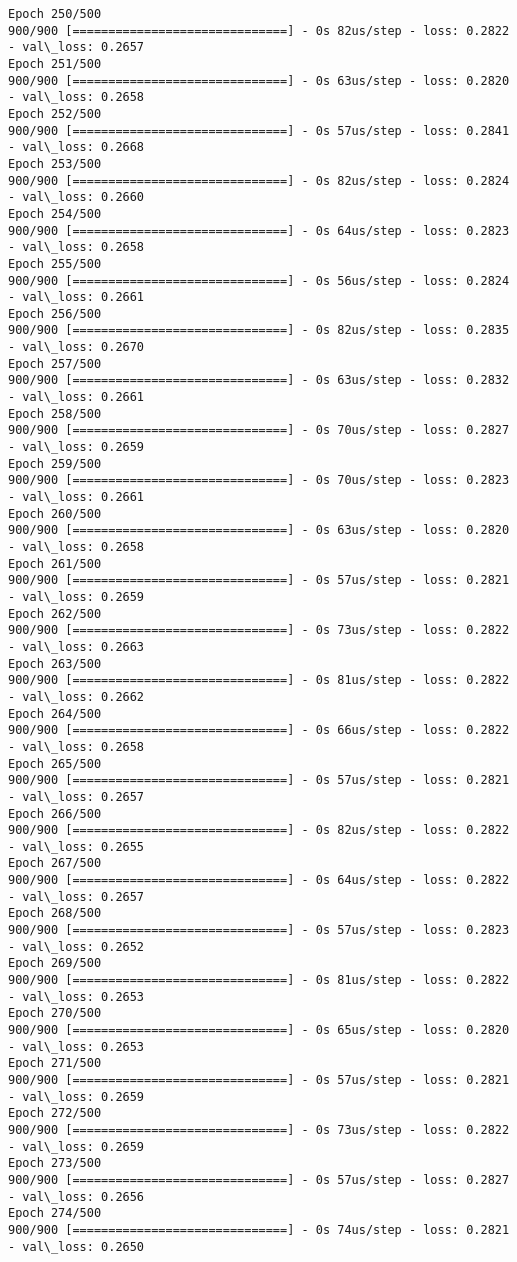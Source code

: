 \documentclass[11pt]{article}
\begin{document}
\begin{Verbatim}[commandchars=\\\{\}]
Epoch 250/500
900/900 [==============================] - 0s 82us/step - loss: 0.2822 - val\_loss: 0.2657
Epoch 251/500
900/900 [==============================] - 0s 63us/step - loss: 0.2820 - val\_loss: 0.2658
Epoch 252/500
900/900 [==============================] - 0s 57us/step - loss: 0.2841 - val\_loss: 0.2668
Epoch 253/500
900/900 [==============================] - 0s 82us/step - loss: 0.2824 - val\_loss: 0.2660
Epoch 254/500
900/900 [==============================] - 0s 64us/step - loss: 0.2823 - val\_loss: 0.2658
Epoch 255/500
900/900 [==============================] - 0s 56us/step - loss: 0.2824 - val\_loss: 0.2661
Epoch 256/500
900/900 [==============================] - 0s 82us/step - loss: 0.2835 - val\_loss: 0.2670
Epoch 257/500
900/900 [==============================] - 0s 63us/step - loss: 0.2832 - val\_loss: 0.2661
Epoch 258/500
900/900 [==============================] - 0s 70us/step - loss: 0.2827 - val\_loss: 0.2659
Epoch 259/500
900/900 [==============================] - 0s 70us/step - loss: 0.2823 - val\_loss: 0.2661
Epoch 260/500
900/900 [==============================] - 0s 63us/step - loss: 0.2820 - val\_loss: 0.2658
Epoch 261/500
900/900 [==============================] - 0s 57us/step - loss: 0.2821 - val\_loss: 0.2659
Epoch 262/500
900/900 [==============================] - 0s 73us/step - loss: 0.2822 - val\_loss: 0.2663
Epoch 263/500
900/900 [==============================] - 0s 81us/step - loss: 0.2822 - val\_loss: 0.2662
Epoch 264/500
900/900 [==============================] - 0s 66us/step - loss: 0.2822 - val\_loss: 0.2658
Epoch 265/500
900/900 [==============================] - 0s 57us/step - loss: 0.2821 - val\_loss: 0.2657
Epoch 266/500
900/900 [==============================] - 0s 82us/step - loss: 0.2822 - val\_loss: 0.2655
Epoch 267/500
900/900 [==============================] - 0s 64us/step - loss: 0.2822 - val\_loss: 0.2657
Epoch 268/500
900/900 [==============================] - 0s 57us/step - loss: 0.2823 - val\_loss: 0.2652
Epoch 269/500
900/900 [==============================] - 0s 81us/step - loss: 0.2822 - val\_loss: 0.2653
Epoch 270/500
900/900 [==============================] - 0s 65us/step - loss: 0.2820 - val\_loss: 0.2653
Epoch 271/500
900/900 [==============================] - 0s 57us/step - loss: 0.2821 - val\_loss: 0.2659
Epoch 272/500
900/900 [==============================] - 0s 73us/step - loss: 0.2822 - val\_loss: 0.2659
Epoch 273/500
900/900 [==============================] - 0s 57us/step - loss: 0.2827 - val\_loss: 0.2656
Epoch 274/500
900/900 [==============================] - 0s 74us/step - loss: 0.2821 - val\_loss: 0.2650

\end{Verbatim}
\end{document}
